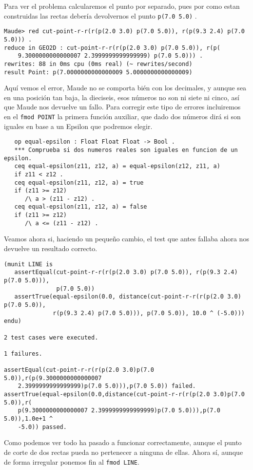 Para ver el problema calcularemos el punto por separado, pues por como estan construidas las rectas debería devolvernos el punto \texttt{p(7.0 5.0)} .\par
{\codesize
\begin{verbatim}
Maude> red cut-point-r-r(r(p(2.0 3.0) p(7.0 5.0)), r(p(9.3 2.4) p(7.0 5.0))) .
reduce in GEO2D : cut-point-r-r(r(p(2.0 3.0) p(7.0 5.0)), r(p(
    9.3000000000000007 2.3999999999999999) p(7.0 5.0))) .
rewrites: 88 in 0ms cpu (0ms real) (~ rewrites/second)
result Point: p(7.0000000000000009 5.0000000000000009)
\end{verbatim}
}
Aquí vemos el error, Maude no se comporta bién con los decimales, y aunque sea en una posición tan baja, la dieciseis, esos números no son ni siete ni cinco, así que Maude nos devuelve un fallo.
Para corregir este tipo de errores incluiremos en el \verb"fmod POINT" la primera función auxiliar, que dado dos números dirá si son iguales en base a un Epsilon que podremos elegir.\par
{\codesize
\begin{verbatim}
   op equal-epsilon : Float Float Float -> Bool .
   *** Comprueba si dos numeros reales son iguales en funcion de un epsilon.
   ceq equal-epsilon(z11, z12, a) = equal-epsilon(z12, z11, a)
   if z11 < z12 .
   ceq equal-epsilon(z11, z12, a) = true
   if (z11 >= z12) 
      /\ a > (z11 - z12) .
   ceq equal-epsilon(z11, z12, a) = false
   if (z11 >= z12) 
      /\ a <= (z11 - z12) .
\end{verbatim}   
}

Veamos ahora si, haciendo un pequeño cambio, el test que antes fallaba ahora nos devuelve un resultado correcto.
{\codesize
\begin{verbatim}
(munit LINE is
   assertEqual(cut-point-r-r(r(p(2.0 3.0) p(7.0 5.0)), r(p(9.3 2.4) p(7.0 5.0))),
               p(7.0 5.0))
   assertTrue(equal-epsilon(0.0, distance(cut-point-r-r(r(p(2.0 3.0) p(7.0 5.0)),
              r(p(9.3 2.4) p(7.0 5.0))), p(7.0 5.0)), 10.0 ^ (-5.0)))
endu)

2 test cases were executed.

1 failures.

assertEqual(cut-point-r-r(r(p(2.0 3.0)p(7.0 5.0)),r(p(9.3000000000000007
    2.3999999999999999)p(7.0 5.0))),p(7.0 5.0)) failed.
assertTrue(equal-epsilon(0.0,distance(cut-point-r-r(r(p(2.0 3.0)p(7.0 5.0)),r(
    p(9.3000000000000007 2.3999999999999999)p(7.0 5.0))),p(7.0 5.0)),1.0e+1 ^
    -5.0)) passed.

\end{verbatim} 
}
Como podemos ver todo ha pasado a funcionar correctamente, aunque el punto de corte de dos rectas pueda no pertenecer a ninguna de ellas. Ahora sí, aunque de forma irregular ponemos fin al \texttt{fmod LINE}. \par
